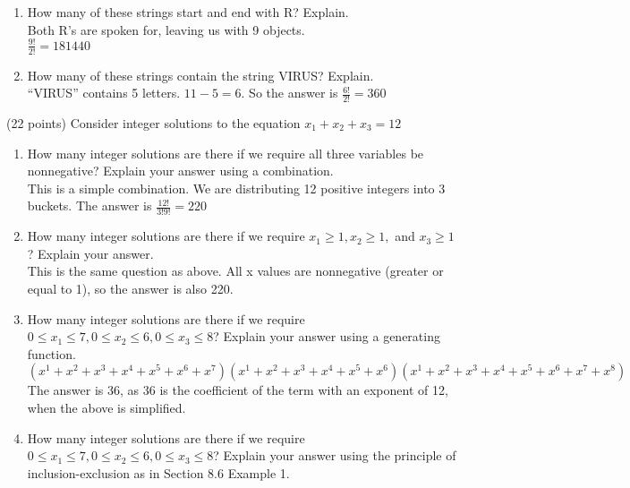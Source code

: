 \documentclass[12pt, letterpaper]{article}
\begin{document}
\begin{flushleft}
\begin{enumerate}
\begin{item}
\begin{enumerate}
      \smallskip
    \item How many of these strings start and end with R? Explain. \\
      \smallskip
      Both R's are spoken for, leaving us with 9 objects. \\
      $\frac{9!}{2!} = 181440$ \\
      \smallskip
    \item How many of these strings contain the string VIRUS? Explain. \\
      \smallskip
      ``VIRUS'' contains 5 letters. $11 - 5 = 6$. So the answer is $\frac{6!}{2!} = 360$ \\
    \end{enumerate}
  \end{item}
    
  \begin{item} (22 points) Consider integer solutions to the equation $x_1 + x_2 + x_3 = 12$ \\
    \begin{enumerate}
    \item How many integer solutions are there if we require all three variables be nonnegative? Explain your answer using a combination. \\
      This is a simple combination. We are distributing 12 positive integers into 3 buckets. The answer is $\frac{12!}{3!9!} = 220$ \\
      \smallskip
    \item How many integer solutions are there if we require $x_1 \geq 1, x_2 \geq 1,$ and $x_3 \geq 1$? Explain your answer. \\
      \smallskip
      This is the same question as above. All x values are nonnegative (greater or equal to 1), so the answer is also 220. \\
      \smallskip
    \item How many integer solutions are there if we require $0 \leq x_1 \leq 7, 0 \leq x_2 \leq 6, 0 \leq x_3 \leq 8$? Explain your answer using a generating function. \\
      \smallskip
      $(x^1+x^2+x^3+x^4+x^5+x^6+x^7)(x^1+x^2+x^3+x^4+x^5+x^6)(x^1+x^2+x^3+x^4+x^5+x^6+x^7+x^8)$ \\
      The answer is 36, as 36 is the coefficient of the term with an exponent of 12, when the above is simplified. \\
      \smallskip
    \item How many integer solutions are there if we require $0 \leq x_1 \leq 7, 0 \leq x_2 \leq 6, 0 \leq x_3 \leq 8$? Explain your answer using the principle of inclusion-exclusion as in Section 8.6 Example 1. \\
      \smallskip



\end{enumerate}
\end{item}
\end{enumerate}
\end{flushleft}
\end{document}

